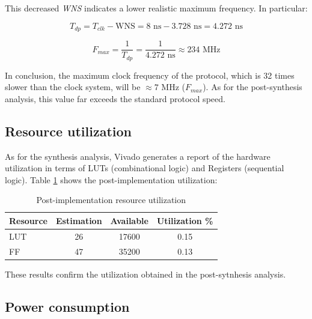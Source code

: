 This decreased \textsl{WNS} indicates a lower realistic maximum frequency. In particular:

\begin{equation}
    T_{dp} = T_{clk} - \text{WNS} = 8 \text{ ns} - 3.728 \text{ ns} = 4.272 \text{ ns}
\end{equation}

\begin{equation}
    F_{max} = \frac{1}{T_{dp}} = \frac{1}{4.272 \text{ ns}} \approx 234 \text{ MHz}
\end{equation}

In conclusion, the maximum clock frequency of the \IIC{} protocol, which is 32 times slower than the clock system, will be $\approx 7$ MHz ($F_{max}$). As for the post-synthesis analysis, this value far exceeds the standard \IIC{} protocol speed.

\subsection{Resource utilization}

As for the synthesis analysis, Vivado generates a report of the hardware utilization in terms of LUTs (combinational logic) and Registers (sequential logic). Table \ref{tab:implementation_utilization} shows the post-implementation utilization:

\begin{table}[h]
    \centering
    \label{tab:implementation_utilization}
        \begin{tabular}{|l|c|c|c|}
        \hline
        \textbf{Resource} & \textbf{Estimation} & \textbf{Available} & \textbf{Utilization \%} \\ \hline
        LUT               & 26                  & 17600              & 0.15                    \\ \hline
        FF                & 47                  & 35200              & 0.13                    \\ \hline
    \end{tabular}
    \caption{Post-implementation resource utilization}
\end{table}

These results confirm the utilization obtained in the post-sytnhesis analysis.

\newpage

\subsection{Power consumption}

